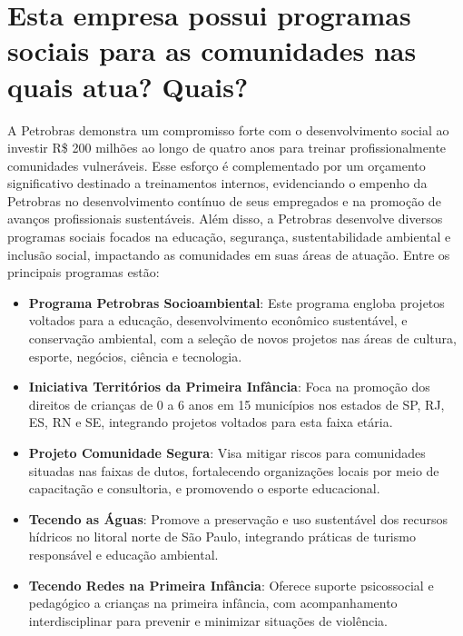 \section{Esta empresa possui programas sociais para as comunidades nas quais atua? Quais?}
A Petrobras demonstra um compromisso forte com o desenvolvimento social ao investir R\$ 200 milhões ao longo de quatro anos para treinar profissionalmente comunidades vulneráveis. Esse esforço é complementado por um orçamento significativo destinado a treinamentos internos, evidenciando o empenho da Petrobras no desenvolvimento contínuo de seus empregados e na promoção de avanços profissionais sustentáveis.
Além disso, a Petrobras desenvolve diversos programas sociais focados na educação, segurança, sustentabilidade ambiental e inclusão social, impactando as comunidades em suas áreas de atuação. Entre os principais programas estão:

\begin{itemize}
    \item \textbf{Programa Petrobras Socioambiental}: Este programa engloba projetos voltados para a educação, desenvolvimento econômico sustentável, e conservação ambiental, com a seleção de novos projetos nas áreas de cultura, esporte, negócios, ciência e tecnologia.
    \item \textbf{Iniciativa Territórios da Primeira Infância}: Foca na promoção dos direitos de crianças de 0 a 6 anos em 15 municípios nos estados de SP, RJ, ES, RN e SE, integrando projetos voltados para esta faixa etária.
    \item \textbf{Projeto Comunidade Segura}: Visa mitigar riscos para comunidades situadas nas faixas de dutos, fortalecendo organizações locais por meio de capacitação e consultoria, e promovendo o esporte educacional.
    \item \textbf{Tecendo as Águas}: Promove a preservação e uso sustentável dos recursos hídricos no litoral norte de São Paulo, integrando práticas de turismo responsável e educação ambiental.
    \item \textbf{Tecendo Redes na Primeira Infância}: Oferece suporte psicossocial e pedagógico a crianças na primeira infância, com acompanhamento interdisciplinar para prevenir e minimizar situações de violência.
\end{itemize}

